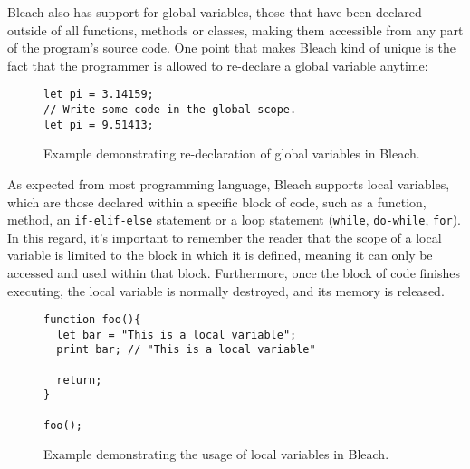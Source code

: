 Bleach also has support for global variables, those that have been declared outside of all functions, methods or classes, making them accessible from any part of the program's source code. One point that makes Bleach kind of unique is the fact that the programmer is allowed to re-declare a global variable anytime:
\begin{figure}[H]
    \centering
    \begin{lstlisting}
let pi = 3.14159;
// Write some code in the global scope.
let pi = 9.51413;
    \end{lstlisting}
    \caption{Example demonstrating re-declaration of global variables in Bleach.}
\end{figure}

As expected from most programming language, Bleach supports local variables, which are those declared within a specific block of code, such as a function, method, an \texttt{if-elif-else} statement or a loop statement (\texttt{while}, \texttt{do-while}, \texttt{for}). In this regard, it's important to remember the reader that the scope of a local variable is limited to the block in which it is defined, meaning it can only be accessed and used within that block. Furthermore, once the block of code finishes executing, the local variable is normally destroyed, and its memory is released.
\begin{figure}[H]
    \centering
    \begin{lstlisting}
function foo(){
  let bar = "This is a local variable";
  print bar; // "This is a local variable"

  return;
}

foo();
    \end{lstlisting}
    \caption{Example demonstrating the usage of local variables in Bleach.}
\end{figure}


